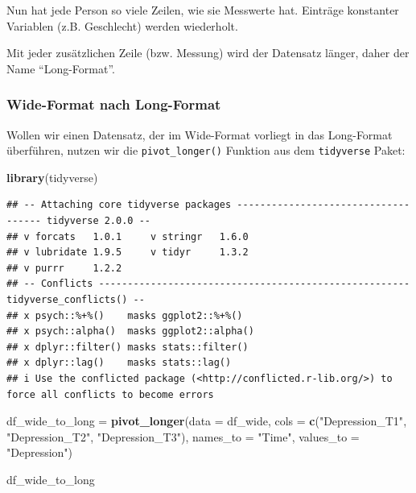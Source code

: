\documentclass[
]{book}
\newenvironment{Shaded}{\begin{snugshade}}{\end{snugshade}}
\newcommand{\AttributeTok}[1]{\textcolor[rgb]{0.13,0.29,0.53}{#1}}
\newcommand{\FunctionTok}[1]{\textcolor[rgb]{0.13,0.29,0.53}{\textbf{#1}}}
\newcommand{\NormalTok}[1]{#1}
\newcommand{\OtherTok}[1]{\textcolor[rgb]{0.56,0.35,0.01}{#1}}
\newcommand{\StringTok}[1]{\textcolor[rgb]{0.31,0.60,0.02}{#1}}
\begin{document}
Nun hat jede Person so viele Zeilen, wie sie Messwerte hat. Einträge konstanter Variablen (z.B. Geschlecht) werden wiederholt.

Mit jeder zusätzlichen Zeile (bzw. Messung) wird der Datensatz länger, daher der Name ``Long-Format''.

\subsubsection{Wide-Format nach Long-Format}\label{wide-format-nach-long-format}

Wollen wir einen Datensatz, der im Wide-Format vorliegt in das Long-Format überführen, nutzen wir die \texttt{pivot\_longer()} Funktion aus dem \texttt{tidyverse} Paket:

\begin{Shaded}
\begin{Highlighting}[]
\FunctionTok{library}\NormalTok{(tidyverse)}
\end{Highlighting}
\end{Shaded}

\begin{verbatim}
## -- Attaching core tidyverse packages ------------------------------------ tidyverse 2.0.0 --
## v forcats   1.0.1     v stringr   1.6.0
## v lubridate 1.9.5     v tidyr     1.3.2
## v purrr     1.2.2     
## -- Conflicts ------------------------------------------------------ tidyverse_conflicts() --
## x psych::%+%()    masks ggplot2::%+%()
## x psych::alpha()  masks ggplot2::alpha()
## x dplyr::filter() masks stats::filter()
## x dplyr::lag()    masks stats::lag()
## i Use the conflicted package (<http://conflicted.r-lib.org/>) to force all conflicts to become errors
\end{verbatim}

\begin{Shaded}
\begin{Highlighting}[]
\NormalTok{df\_wide\_to\_long }\OtherTok{=} \FunctionTok{pivot\_longer}\NormalTok{(}\AttributeTok{data =}\NormalTok{ df\_wide, }
                               \AttributeTok{cols =} \FunctionTok{c}\NormalTok{(}\StringTok{"Depression\_T1"}\NormalTok{, }\StringTok{"Depression\_T2"}\NormalTok{, }\StringTok{"Depression\_T3"}\NormalTok{), }
                               \AttributeTok{names\_to =} \StringTok{"Time"}\NormalTok{, }
                               \AttributeTok{values\_to =} \StringTok{"Depression"}\NormalTok{)}

\NormalTok{df\_wide\_to\_long}
\end{Highlighting}
\end{Shaded}
\end{document}
